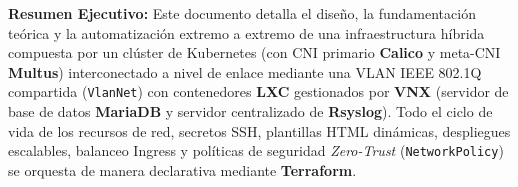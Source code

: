 \documentclass[11pt,a4paper]{report}
\begin{document}
\begin{titlepage}
  \vfill
  \begin{tcolorbox}[colback=codebg,colframe=codeframe,width=0.96\linewidth,arc=3pt,boxrule=0.6pt]
    \footnotesize
    \textbf{Resumen Ejecutivo:} Este documento detalla el diseño, la fundamentación teórica y la automatización extremo a extremo de una infraestructura híbrida compuesta por un clúster de Kubernetes (con CNI primario \textbf{Calico} y meta-CNI \textbf{Multus}) interconectado a nivel de enlace mediante una VLAN IEEE 802.1Q compartida (\texttt{VlanNet}) con contenedores \textbf{LXC} gestionados por \textbf{VNX} (servidor de base de datos \textbf{MariaDB} y servidor centralizado de \textbf{Rsyslog}). Todo el ciclo de vida de los recursos de red, secretos SSH, plantillas HTML dinámicas, despliegues escalables, balanceo Ingress y políticas de seguridad \textit{Zero-Trust} (\texttt{NetworkPolicy}) se orquesta de manera declarativa mediante \textbf{Terraform}.
  \end{tcolorbox}
\end{titlepage}

\tableofcontents
\clearpage
{}







\end{document}
